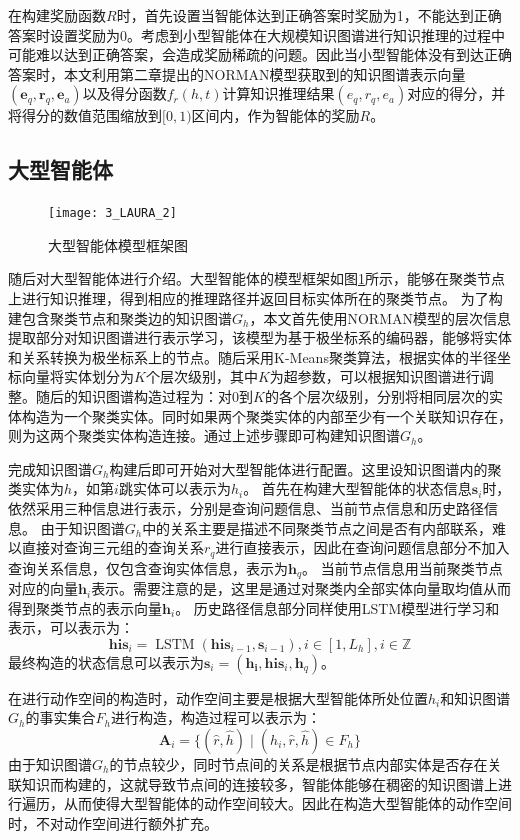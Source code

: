 \documentclass[algorithmlist, AutoFakeBold, AutoFakeSlant, figurelist, tablelist, nomlist, engineering, openany]{seuthesix} %
\begin{document}
在构建奖励函数$R$时，首先设置当智能体达到正确答案时奖励为1，不能达到正确答案时设置奖励为0。考虑到小型智能体在大规模知识图谱进行知识推理的过程中可能难以达到正确答案，会造成奖励稀疏的问题。因此当小型智能体没有到达正确答案时，本文利用第二章提出的NORMAN模型获取到的知识图谱表示向量$(\bm{e}_q, \bm{r}_q, \bm{e}_a)$以及得分函数$f_r(h, t)$计算知识推理结果$(e_q, r_q, e_a)$对应的得分，并将得分的数值范围缩放到$[0, 1)$区间内，作为智能体的奖励$R$。

\subsection{大型智能体}
\begin{figure}
  \centering
  \texttt{[image: 3\_LAURA\_2]}
  \caption{大型智能体模型框架图}
  \label{3_LAURA_2}
\end{figure}
随后对大型智能体进行介绍。大型智能体的模型框架如图\ref{3_LAURA_2}所示，能够在聚类节点上进行知识推理，得到相应的推理路径并返回目标实体所在的聚类节点。
为了构建包含聚类节点和聚类边的知识图谱$G_h$，本文首先使用NORMAN模型的层次信息提取部分对知识图谱进行表示学习，该模型为基于极坐标系的编码器，能够将实体和关系转换为极坐标系上的节点。随后采用K-Means聚类算法，根据实体的半径坐标向量将实体划分为$K$个层次级别，其中$K$为超参数，可以根据知识图谱进行调整。随后的知识图谱构造过程为：对0到$K$的各个层次级别，分别将相同层次的实体构造为一个聚类实体。同时如果两个聚类实体的内部至少有一个关联知识存在，则为这两个聚类实体构造连接。通过上述步骤即可构建知识图谱$G_h$。

完成知识图谱$G_h$构建后即可开始对大型智能体进行配置。这里设知识图谱内的聚类实体为$h$，如第$i$跳实体可以表示为$h_i$。
首先在构建大型智能体的状态信息$\bm{s}_i$时，依然采用三种信息进行表示，分别是查询问题信息、当前节点信息和历史路径信息。
由于知识图谱$G_h$中的关系主要是描述不同聚类节点之间是否有内部联系，难以直接对查询三元组的查询关系$r_q$进行直接表示，因此在查询问题信息部分不加入查询关系信息，仅包含查询实体信息，表示为$\bm{h}_q$。
当前节点信息用当前聚类节点对应的向量$\bm{h}_i$表示。需要注意的是，这里是通过对聚类内全部实体向量取均值从而得到聚类节点的表示向量$\bm{h}_i$。
历史路径信息部分同样使用LSTM模型进行学习和表示，可以表示为：
\begin{equation}
  \bm{his}_i=\operatorname{LSTM}\left(\bm{his}_{i - 1}, \bm{s}_{i - 1}\right), i \in [1, L_h], i \in \mathbb{Z}
\end{equation}
最终构造的状态信息可以表示为$\bm{s}_i = (\bm{h_i}, \bm{his}_i, \bm{h}_q)$。

在进行动作空间的构造时，动作空间主要是根据大型智能体所处位置$h_i$和知识图谱$G_h$的事实集合$F_h$进行构造，构造过程可以表示为：
\begin{equation}
  \bm{A}_i = \{(\hat{r}, \hat{h}) \mid (h_i, \hat{r}, \hat{h}) \in F_h\}
  \label{base_2}
\end{equation}
由于知识图谱$G_h$的节点较少，同时节点间的关系是根据节点内部实体是否存在关联知识而构建的，这就导致节点间的连接较多，智能体能够在稠密的知识图谱上进行遍历，从而使得大型智能体的动作空间较大。因此在构造大型智能体的动作空间时，不对动作空间进行额外扩充。
\end{document}
